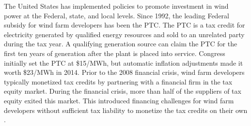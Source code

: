 \documentclass[12pt]{article}
\begin{document}
The United States has implemented policies to promote investment in wind power at the Federal, state, and local levels. Since 1992, the leading Federal subsidy for wind farm developers has been the PTC. The PTC is a tax credit for electricity generated by qualified energy resources and sold to an unrelated party during the tax year. A qualifying generation source can claim the PTC for the first ten years of generation after the plant is placed into service. Congress initially set the PTC at \$15/MWh, but automatic inflation adjustments made it worth \$23/MWh in 2014. Prior to the 2008 financial crisis, wind farm developers typically monetized tax credits by partnering with a financial firm in the tax equity market. During the financial crisis, more than half of the suppliers of tax equity exited this market. This introduced financing challenges for wind farm developers without sufficient tax liability to monetize the tax credits on their own \citep{u.s._pref_prospective_2010}.
\end{document}
